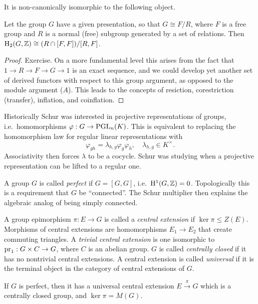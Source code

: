 It is non-canonically isomorphic to the following object.

\begin{thm}
    Let the group $G$ have a given presentation, so that $G\cong F\slash R$, where $F$ is a free group and $R$ is a normal (free) subgroup generated by a set of relations. Then $\mathrm{H}_2(G,\mathbb{Z})\cong (R\cap [F,F])\slash [R,F]$.
\end{thm}
\begin{proof}
    Exercise. On a more fundamental level this arises from the fact that $1\to R\to F\to G\to 1$ is an exact sequence, and we could develop yet another set of derived functors with respect to this group argument, as opposed to the module argument ($A$). This leads to the concepts of resiction, corestriction (transfer), inflation, and coinflation.
\end{proof}

Historically Schur was interested in projective representations of groups, i.e.~homomorphisms $\varphi:G\to \operatorname{PGL}_n(K)$. This is equivalent to replacing the homomorphism law for regular linear representations with
\[\varphi_{gh}=\lambda_{h,g}\varphi_g\varphi_h,\quad\lambda_{h,g}\in K^\times.\]
Associativity then forces $\lambda$ to be a cocycle. Schur was studying when a projective representation can be lifted to a regular one. 

A group $G$ is called \emph{perfect} if $G=[G,G]$, i.e.~$\mathrm{H}^1(G,\mathbb{Z})=0$. Topologically this is a requirement that $G$ be ``connected''. The Schur multiplier then explains the algebraic analog of being simply connected. 

\begin{defn}
    A group epimorphism $\pi:E\to G$ is called a \emph{central extension} if $\ker\pi\leq Z(E)$.  Morphisms of central extensions are homomorphisms $E_1\to E_2$ that create commuting triangles. A \emph{trivial central extension} is one isomorphic to $\operatorname{pr}_1:G\times C\to G$, where $C$ is an abelian group. $G$ is called \emph{centrally closed} if it has no nontrivial central extensions. A central extension is called \emph{universal} if it is the terminal object in the category of central extensions of $G$.
\end{defn}

\begin{thm}[Schur]
    If $G$ is perfect, then it has a universal central extension $E\overset{\pi}{\to} G$ which is a centrally closed group, and $\ker\pi =M(G)$.
\end{thm}

